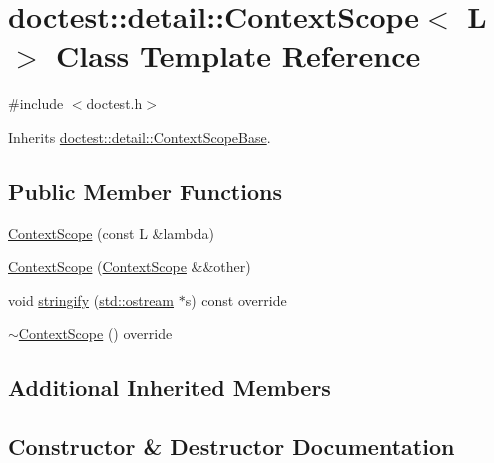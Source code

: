 \hypertarget{classdoctest_1_1detail_1_1_context_scope}{}\section{doctest\+:\+:detail\+:\+:Context\+Scope$<$ L $>$ Class Template Reference}
\label{classdoctest_1_1detail_1_1_context_scope}


{\ttfamily \#include $<$doctest.\+h$>$}



Inherits \mbox{\hyperlink{classdoctest_1_1detail_1_1_context_scope_base}{doctest\+::detail\+::\+Context\+Scope\+Base}}.

\subsection*{Public Member Functions}
\begin{DoxyCompactItemize}
\item 
\mbox{\hyperlink{classdoctest_1_1detail_1_1_context_scope_a344c76a0374615d567a084c0a0ffd215}{Context\+Scope}} (const L \&lambda)
\item 
\mbox{\hyperlink{classdoctest_1_1detail_1_1_context_scope_afca3228fdeb0e86257a21f826c4247ff}{Context\+Scope}} (\mbox{\hyperlink{classdoctest_1_1detail_1_1_context_scope}{Context\+Scope}} \&\&other)
\item 
void \mbox{\hyperlink{classdoctest_1_1detail_1_1_context_scope_a4636ac32ae41ae108c7ada4a164ffaeb}{stringify}} (\mbox{\hyperlink{doctest_8h_a116af65cb5e924b33ad9d9ecd7a783f3}{std\+::ostream}} $\ast$s) const override
\item 
\mbox{\hyperlink{classdoctest_1_1detail_1_1_context_scope_a1ee7d4702398ee8d0e80ab843aa260d7}{$\sim$\+Context\+Scope}} () override
\end{DoxyCompactItemize}
\subsection*{Additional Inherited Members}


\subsection{Constructor \& Destructor Documentation}
\mbox{\label{classdoctest_1_1detail_1_1_context_scope_a344c76a0374615d567a084c0a0ffd215}} 
